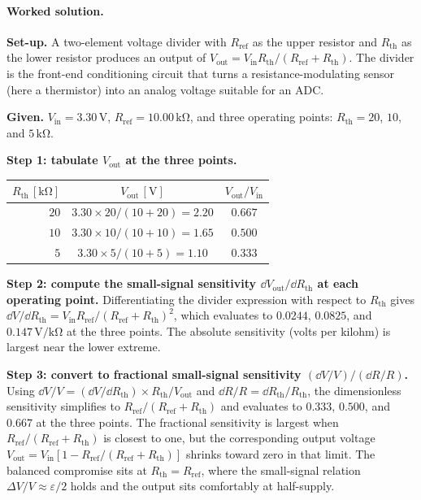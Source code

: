 \paragraph{Worked solution.}
\textbf{Set-up.} A two-element voltage divider with $R_{\text
{ref}}$ as the upper resistor and $R_{\text{th}}$ as the lower
resistor produces an output of $V_{\text{out}} = V_{\text{in}}
R_{\text{th}}/(R_{\text{ref}} + R_{\text{th}})$. The divider is
the front-end conditioning circuit that turns a
resistance-modulating sensor (here a thermistor) into an
analog voltage suitable for an ADC.

\textbf{Given.} $V_{\text{in}} = 3.30 \,\si{\volt}$, $R_{\text
{ref}} = 10.00 \,\si{\kilo\ohm}$, and three operating points:
$R_{\text{th}} = 20$, $10$, and $5 \,\si{\kilo\ohm}$.

\textbf{Step 1: tabulate $V_{\text{out}}$ at the three points.}
\begin{center}
\begin{tabular}{rcc}
\toprule
$R_{\text{th}} \,[\si{\kilo\ohm}]$ & $V_{\text{out}} \,[\si{\volt}]$ &
$V_{\text{out}}/V_{\text{in}}$ \\
\midrule
$20$ & $3.30 \times 20/(10 + 20) = 2.20$ & $0.667$ \\
$10$ & $3.30 \times 10/(10 + 10) = 1.65$ & $0.500$ \\
$5$ & $3.30 \times 5/(10 + 5) = 1.10$ & $0.333$ \\
\bottomrule
\end{tabular}
\end{center}

\textbf{Step 2: compute the small-signal sensitivity
$\dd V_{\text{out}}/\dd R_{\text{th}}$ at each operating point.}
Differentiating the divider expression with respect to $R_{\text
{th}}$ gives
$\dd V/\dd R_{\text{th}} = V_{\text{in}} R_{\text{ref}}/(R_{\text
{ref}} + R_{\text{th}})^{2}$, which evaluates to $0.0244$, $0.0825$,
and $0.147 \,\si{\volt\per\kilo\ohm}$ at the three points. The
absolute sensitivity (volts per kilohm) is largest near the lower
extreme.

\textbf{Step 3: convert to fractional small-signal sensitivity
$(\dd V/V)/(\dd R/R)$.} Using $\dd V/V = (\dd V/\dd R_{\text{th}})
\times R_{\text{th}}/V_{\text{out}}$ and $\dd R/R = \dd R_{\text
{th}}/R_{\text{th}}$, the dimensionless sensitivity simplifies to
$R_{\text{ref}}/(R_{\text{ref}} + R_{\text{th}})$ and evaluates to
$0.333$, $0.500$, and $0.667$ at the three points. The fractional
sensitivity is largest when $R_{\text{ref}}/(R_{\text{ref}} +
R_{\text{th}})$ is closest to one, but the corresponding output
voltage $V_{\text{out}} = V_{\text{in}}[1 - R_{\text{ref}}/(R_{\text
{ref}} + R_{\text{th}})]$ shrinks toward zero in that limit. The
balanced compromise sits at $R_{\text{th}} = R_{\text{ref}}$,
where the small-signal relation $\Delta V/V \approx \varepsilon/2$
holds and the output sits comfortably at half-supply.

